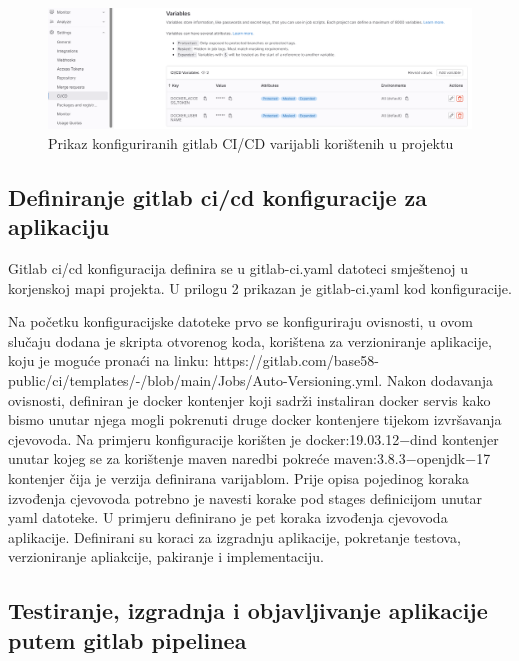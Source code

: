 \documentclass[a4paper,12pt,oneside]{article}
\begin{document}
\begin{figure}
    \centering
    \includegraphics[width=1\linewidth]{Slike/gitlab-variables.png}
    \caption{Prikaz konfiguriranih gitlab CI/CD varijabli korištenih u projektu}
    \label{fig:git-variables}
\end{figure}

\subsection{Definiranje gitlab ci/cd konfiguracije za aplikaciju}

Gitlab ci/cd konfiguracija definira se u gitlab-ci.yaml datoteci smještenoj u korjenskoj mapi projekta. U prilogu 2 prikazan je gitlab-ci.yaml kod konfiguracije.


Na početku konfiguracijske datoteke prvo se konfiguriraju ovisnosti, u ovom slučaju dodana je skripta otvorenog koda, korištena za verzioniranje aplikacije, koju je moguće pronaći na linku: https://gitlab.com/base58-public/ci/templates/-/blob/main/Jobs/Auto-Versioning.yml. Nakon dodavanja ovisnosti, definiran je docker kontenjer koji sadrži instaliran docker servis kako bismo unutar njega mogli pokrenuti druge docker kontenjere tijekom izvršavanja cjevovoda. Na primjeru konfiguracije korišten je docker:19.03.12−dind kontenjer unutar kojeg se za korištenje maven naredbi pokreće maven:3.8.3−openjdk−17 kontenjer čija je verzija definirana varijablom. Prije opisa pojedinog koraka izvođenja cjevovoda potrebno je navesti korake pod stages definicijom unutar yaml datoteke. U primjeru definirano je pet koraka izvođenja cjevovoda aplikacije. Definirani su koraci za izgradnju aplikacije, pokretanje testova, verzioniranje apliakcije, pakiranje i implementaciju. 


\subsection{Testiranje, izgradnja i objavljivanje aplikacije putem gitlab pipelinea}
\end{document}
